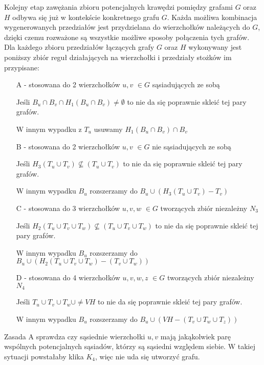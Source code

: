 Kolejny etap zawężania zbioru potencjalnych krawędzi pomiędzy grafami $G$ oraz $H$ odbywa się już w kontekście konkretnego grafu $G$. Każda możliwa kombinacja wygenerowanych przedziałów jest  przydzielana do wierzchołków należących do $G$, dzięki czemu rozważone są wszystkie możliwe sposoby połączenia tych grafów. Dla każdego zbioru przedziałów łączących grafy $G$ oraz $H$ wykonywany jest poniższy zbiór reguł działających na wierzchołki i przedziały stożków im przypisane:
\begin{itemize}
  \item[A] - stosowana do 2 wierzchołków $u,v$ $\in G$ sąsiadujących ze sobą 
  
  Jeśli $B_u \cap B_v \cap H_1(B_u \cap B_v) \neq \emptyset $ to nie da się 
  poprawnie skleić tej pary grafów. 
  
  W innym wypadku z $T_u$ usuwamy $H_1(B_u \cap B_v) \cap B_v $  
  \item[B] - stosowana do 2 wierzchołków $u,v$ $\in G$ nie sąsiadujących ze sobą 
  
  Jeśli $H_3(T_u \cup T_v) \not\subseteq (T_u \cup T_v)$ to nie da się poprawnie skleić tej 
  pary grafów. 
  
  W innym wypadku $B_u$ rozszerzamy do $B_u \cup (H_3(T_u \cup T_v) - T_v)$
  \item[C] - stosowana do 3 wierzchołków $u,v,w$ $\in G$ tworzących zbiór niezależny $N_3$ 
  
  Jeśli $H_2(T_u \cup T_v \cup T_w) \not\subseteq (T_u \cup T_v \cup T_w)$ 
  to nie da się poprawnie skleić tej pary grafów. 
  
  W innym wypadku $B_u$ rozszerzamy do $B_u \cup (H_2(T_u \cup T_v \cup T_w) - (T_v \cup T_w))$
  \item[D] - stosowana do 4 wierzchołków $u,v,w,z$ $\in G$ tworzących zbiór niezależny $N_4$  
  
  Jeśli $T_u \cup T_v \cup T_w \cup \neq VH $ to nie da się poprawnie skleić tej pary grafów.
  
  W innym wypadku $B_u$ rozszerzamy do $B_u \cup (VH - (T_v \cup T_w \cup T_z))$
\end{itemize}

Zasada A sprawdza czy sąsiednie wierzchołki $u, v$ mają jakąkolwiek parę wspólnych potencjalnych sąsiadów, którzy są sąsiedni względem siebie.
W takiej sytuacji powstałaby klika $K_4$, więc nie uda się utworzyć grafu. \par

